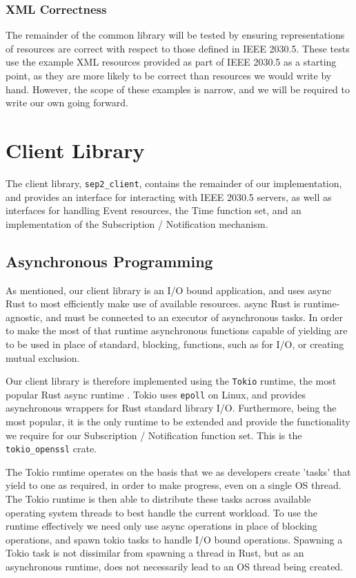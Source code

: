 \subsubsection{XML Correctness}
The remainder of the common library will be tested by ensuring representations of resources are correct with respect to those defined in IEEE 2030.5.
These tests use the example XML resources provided as part of IEEE 2030.5 as a starting point, as they are more likely to be correct than resources we would write by hand. However, the scope of these examples is narrow, and we will be required to write our own going forward.

\section{Client Library}
The client library, \texttt{sep2\_client}, contains the remainder of our implementation, and provides an interface for interacting with IEEE 2030.5 servers, as well as interfaces for handling Event resources, the Time function set, and an implementation of the Subscription / Notification mechanism. 

\subsection{Asynchronous Programming}
As mentioned, our client library is an I/O bound application, and uses async Rust to most efficiently make use of available resources. async Rust is runtime-agnostic, and must be connected to an executor of asynchronous tasks. In order to make the most of that runtime asynchronous functions capable of yielding are to be used in place of standard, blocking, functions, such as for I/O, or creating mutual exclusion.

Our client library is therefore implemented using the \texttt{Tokio} runtime, the most popular Rust async runtime \cite{Tokio}. Tokio uses \texttt{epoll} on Linux, and provides asynchronous wrappers for Rust standard library I/O. Furthermore, being the most popular, it is the only runtime to be extended and provide the functionality we require for our Subscription / Notification function set. This is the \texttt{tokio\_openssl} crate.

The Tokio runtime operates on the basis that we as developers create 'tasks' that yield to one as required, in order to make progress, even on a single OS thread. The Tokio runtime is then able to distribute these tasks across available operating system threads to best handle the current workload. To use the runtime effectively we need only use async operations in place of blocking operations, and spawn tokio tasks to handle I/O bound operations.  Spawning a Tokio task is not dissimilar from spawning a thread in Rust, but as an asynchronous runtime, does not necessarily lead to an OS thread being created.

